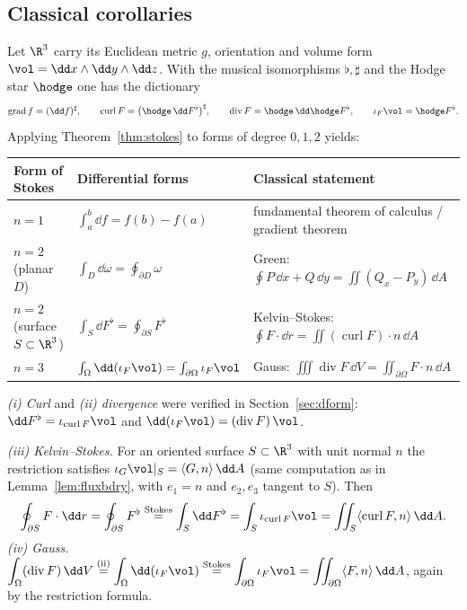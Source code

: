 \subsection{Classical corollaries}\label{sec:classical}

Let $\R^3$ carry its Euclidean metric $g$, orientation and volume form $\vol=\dd x\wedge\dd y\wedge\dd z$. With the musical isomorphisms $\flat,\sharp$ and the Hodge star $\hodge$ one has the dictionary
\[
\operatorname{grad}f=(\dd f)^\sharp,\qquad
\operatorname{curl}F=\bigl(\hodge\,\dd F^\flat\bigr)^\sharp,\qquad
\operatorname{div}F=\hodge\,\dd\hodge F^\flat,\qquad
\iota_F\vol=\hodge F^\flat .
\]
Applying Theorem~\ref{thm:stokes} to forms of degree $0,1,2$ yields:

\begin{center}
\small
\renewcommand{\arraystretch}{1.4}
\begin{tabular}{@{}p{2.5cm}p{4.5cm}p{7.0cm}@{}}
\toprule
\textbf{Form of Stokes} & \textbf{Differential forms} & \textbf{Classical statement}\\
\midrule
$n=1$ & $\int_a^b\dd f=f(b)-f(a)$ & fundamental theorem of calculus / gradient theorem\\
$n=2$ (planar $D$) & $\int_D\dd\omega=\oint_{\partial D}\omega$ & Green: $\oint P\,\dd x+Q\,\dd y=\iint(Q_x-P_y)\,\dd A$\\
$n=2$ (surface $S\subset\R^3$) & $\int_S\dd F^\flat=\oint_{\partial S}F^\flat$ & Kelvin--Stokes: $\oint F\cdot\dd r=\iint(\operatorname{curl}F)\cdot n\,\dd A$\\
$n=3$ & $\int_\Omega\dd(\iota_F\vol)=\int_{\partial\Omega}\iota_F\vol$ & Gauss: $\iiint\operatorname{div}F\,\dd V=\iint_{\partial\Omega}F\cdot n\,\dd A$\\
\bottomrule
\end{tabular}
\end{center}

\emph{(i) Curl} and \emph{(ii) divergence} were verified in Section~\ref{sec:dform}: $\dd F^\flat=\iota_{\operatorname{curl}F}\vol$ and
$\dd(\iota_F\vol)=(\operatorname{div}F)\,\vol$.

\emph{(iii) Kelvin--Stokes.} For an oriented surface $S\subset\R^3$ with unit normal $n$ the restriction satisfies $\iota_G\vol|_S=\langle G,n\rangle\,\dd A$ (same computation as in Lemma~\ref{lem:fluxbdry}, with $e_1=n$ and $e_2,e_3$ tangent to $S$). Then
\[
\oint_{\partial S}F\cdot\dd r=\oint_{\partial S}F^\flat\overset{\text{Stokes}}=\int_S\dd F^\flat=\int_S\iota_{\operatorname{curl}F}\vol=\iint_S\langle\operatorname{curl}F,n\rangle\,\dd A .
\]
\emph{(iv) Gauss.} $\displaystyle\int_\Omega(\operatorname{div}F)\,\dd V\overset{\text{(ii)}}=\int_\Omega\dd(\iota_F\vol)\overset{\text{Stokes}}=\int_{\partial\Omega}\iota_F\vol=\iint_{\partial\Omega}\langle F,n\rangle\,\dd A$, again by the restriction formula.
